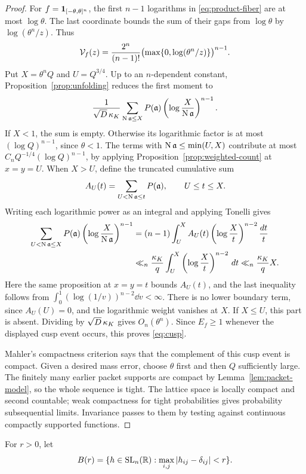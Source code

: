 \begin{proof}
For $f=\mathbf 1_{[-\theta,\theta]^n}$, the first $n-1$ logarithms
in \eqref{eq:product-fiber} are at most $\log\theta$.
The last coordinate bounds the sum of their gaps from
$\log\theta$ by $\log(\theta^n/z)$. Thus
\[
 \mathcal V_f(z)=\frac{2^n}{(n-1)!}
           \bigl(\max\{0,\log(\theta^n/z)\}\bigr)^{n-1}.
\]
Put $X=\theta^nQ$ and $U=Q^{3/4}$. Up to an $n$-dependent
constant, Proposition~\ref{prop:unfolding} reduces the first
moment to
\[
 \frac1{\sqrt D\,\kappa_K}
 \sum_{\operatorname{N}\mathfrak a\le X}
     P(\mathfrak a)\left(\log\frac X{\operatorname{N}\mathfrak a}\right)^{n-1}.
\]
If $X<1$, the sum is empty. Otherwise its logarithmic factor is
at most $(\log Q)^{n-1}$, since $\theta<1$. The terms with
$\operatorname{N}\mathfrak a\le\min(U,X)$ contribute at most
$C_nQ^{-1/4}(\log Q)^{n-1}$, by applying
Proposition~\ref{prop:weighted-count} at $x=y=U$.
When $X>U$, define the truncated cumulative sum
\[
 A_U(t)=\sum_{U<\operatorname{N}\mathfrak a\le t}P(\mathfrak a),
 \qquad U\le t\le X.
\]
Writing each logarithmic power as an integral and applying Tonelli gives
\begin{align*}
 \sum_{U<\operatorname{N}\mathfrak a\le X}
   P(\mathfrak a)\left(\log\frac X{\operatorname{N}\mathfrak a}\right)^{n-1}
 &= (n-1)\int_U^X A_U(t)
      \left(\log\frac Xt\right)^{n-2}\frac{dt}{t} \\
 &\ll_n \frac{\kappa_K}{q}
      \int_U^X\left(\log\frac Xt\right)^{n-2}\,d t
 \ll_n \frac{\kappa_K}{q}X.
\end{align*}
Here the same proposition at $x=y=t$ bounds $A_U(t)$, and the
last inequality follows from
$\int_0^1(\log(1/v))^{n-2}\dd v<\infty$.
There is no lower boundary term, since $A_U(U)=0$, and the
logarithmic weight vanishes at $X$. If $X\le U$, this part is absent.
Dividing by $\sqrt D\,\kappa_K$ gives $O_n(\theta^n)$.
Since $E_f\ge1$ whenever the displayed cusp event occurs,
this proves \eqref{eq:cusp}.

Mahler's compactness criterion \cite[Section~3, Theorem~2]{Mahler1946} says that the
complement of this cusp event is compact. Given a desired
mass error, choose $\theta$ first and then $Q$ sufficiently large.
The finitely many earlier packet supports are compact by
Lemma~\ref{lem:packet-model}, so the whole sequence is tight.
The lattice space is locally compact and second countable;
weak compactness for tight probabilities gives probability
subsequential limits. Invariance passes to them by testing
against continuous compactly supported functions.
\end{proof}

For $r>0$, let
\[
 B(r)=\{h\in\operatorname{SL}_n(\mathbb R):
             \max_{i,j}|h_{ij}-\delta_{ij}|<r\}.
\]

